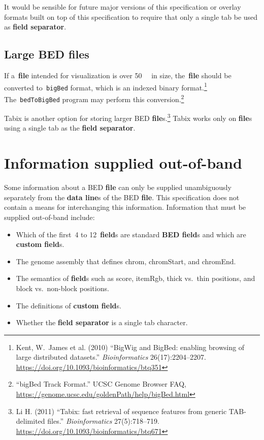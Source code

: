 \documentclass[11pt]{article}
\providecommand*{\Ac}[1]{\ac{#1}} %
\begin{document}
It would be sensible for future major versions of this specification or overlay formats built on top of this specification to require that only a single tab be used as \textbf{field separator}.

\subsection{Large \acs{BED} files}
If a~\textbf{file} intended for visualization is over \SI{50}{\mebi\byte} in size, the~\textbf{file} should be converted to~\texttt{bigBed} format, which is an indexed binary format.\footnote{Kent, W.~James et al.
  (2010) ``BigWig and BigBed: enabling browsing of large distributed datasets.''
  \emph{Bioinformatics} 26(17):2204--2207.
  \url{https://doi.org/10.1093/bioinformatics/btq351}}
The~\texttt{bedToBigBed} program may perform this conversion.\footnote{``bigBed Track Format.''
  \Ac{UCSC} Genome Browser FAQ, \url{https://genome.ucsc.edu/goldenPath/help/bigBed.html}}

Tabix is another option for storing larger \ac{BED} \textbf{file}s.\footnote{Li H.
  (2011) ``Tabix: fast retrieval of sequence features from generic TAB-delimited files.''
  \emph{Bioinformatics} 27(5):718--719.
  \url{https://doi.org/10.1093/bioinformatics/btq671}}
Tabix works only on \textbf{file}s using a single tab as the \textbf{field separator}.

\section{Information supplied out-of-band}

Some information about a \ac{BED} \textbf{file} can only be supplied unambiguously separately from the \textbf{data line}s of the \ac{BED} \textbf{file}.
This specification does not contain a means for interchanging this information.
Information that must be supplied out-of-band include:

\begin{itemize}[noitemsep]
    \item Which of the first~4 to 12~\textbf{field}s are standard \textbf{\acs{BED} field}s and which are \textbf{custom field}s.
    \item The genome assembly that defines \textsf{chrom}, \textsf{chromStart}, and \textsf{chromEnd}.
    \item The semantics of \textbf{field}s such as \textsf{score}, \textsf{itemRgb}, thick vs.~thin positions, and block vs.~non-block positions.
    \item The definitions of \textbf{custom field}s.
    \item Whether the \textbf{field separator} is a single tab character.
\end{itemize}
\end{document}
